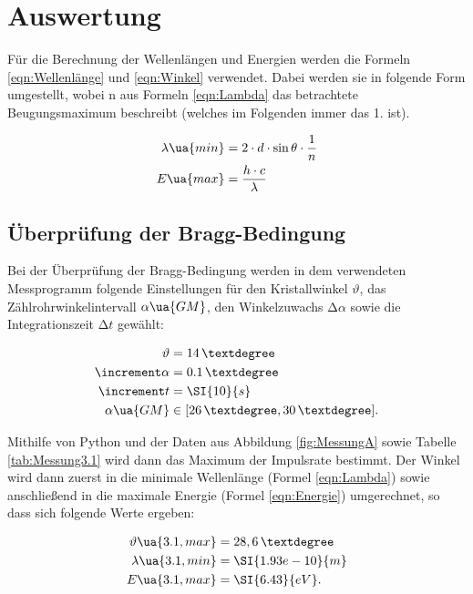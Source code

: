 \section{Auswertung}

Für die Berechnung
der Wellenlängen und Energien werden die Formeln \eqref{eqn:Wellenlänge}
und \eqref{eqn:Winkel} verwendet. Dabei werden sie in
folgende Form umgestellt, wobei n aus Formeln \eqref{eqn:Lambda} das betrachtete
Beugungsmaximum beschreibt (welches im Folgenden immer das 1. ist).

\begin{align}
  \label{eqn:Lambda}
  \lambda\ua{min} &= 2 \cdot d \cdot \sin{\theta} \cdot \frac{1}{n} \\
  \label{eqn:Energie}
  E\ua{max} &= \frac{h \cdot c}{\lambda} \\
\end{align}

\subsection{Überprüfung der Bragg-Bedingung}

Bei der Überprüfung der Bragg-Bedingung werden in dem verwendeten Messprogramm
folgende Einstellungen für den Kristallwinkel $\vartheta$, das Zählrohrwinkelintervall
$\alpha\ua{GM}$, den Winkelzuwachs $\increment\alpha$ sowie die Integrationszeit
$\increment t$ gewählt:

\begin{align*}
  \vartheta        &= 14 \,° \\
  \increment\alpha &= 0.1\, ° \\
  \increment t     &= \SI{10}{s} \\
  \alpha\ua{GM}    &\in [26\, °, 30\, °] .
\end{align*}

Mithilfe von Python und der Daten aus Abbildung \ref{fig:MessungA} sowie Tabelle
\ref{tab:Messung3.1} wird dann das Maximum der
Impulsrate bestimmt. Der Winkel wird dann zuerst in die minimale Wellenlänge (Formel
\eqref{eqn:Lambda}) sowie
anschließend in die maximale Energie (Formel \eqref{eqn:Energie}) umgerechnet,
so dass sich folgende Werte ergeben:

\begin{align*}
  \vartheta\ua{3.1,max} &= 28,6\, ° \\
  \lambda\ua{3.1,min} &= \SI{1.93e-10}{m} \\
  E\ua{3.1, max} &= \SI{6.43}{eV} .
\end{align*}


